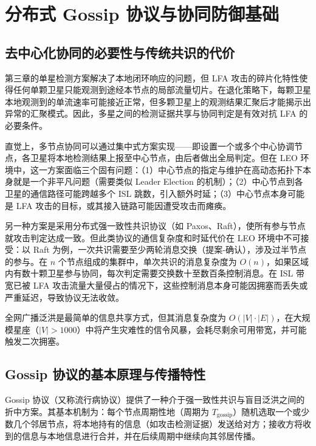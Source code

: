 \section{分布式 Gossip 协议与协同防御基础}

\subsection{去中心化协同的必要性与传统共识的代价}

第三章的单星检测方案解决了本地闭环响应的问题，但 LFA 攻击的碎片化特性使得任何单颗卫星只能观测到途经本节点的局部流量切片。在退化策略下，每颗卫星本地观测到的单流速率可能接近正常，但多颗卫星上的观测结果汇聚后才能揭示出异常的汇聚模式。因此，多星之间的检测证据共享与协同判定是有效对抗 LFA 的必要条件。

直觉上，多节点协同可以通过集中式方案实现——即设置一个或多个中心协调节点，各卫星将本地检测结果上报至中心节点，由后者做出全局判定。但在 LEO 环境中，这一方案面临三个固有问题：（1）中心节点的指定与维护在高动态拓扑下本身就是一个非平凡问题（需要类似 Leader Election 的机制）；（2）中心节点到各卫星的通信路径可能跨越多个 ISL 跳数，引入额外时延；（3）中心节点本身可能是 LFA 攻击的目标，或其接入链路可能因遭受攻击而瘫痪。

另一种方案是采用分布式强一致性共识协议（如 Paxos、Raft），使所有参与节点就攻击判定达成一致。但此类协议的通信复杂度和时延代价在 LEO 环境中不可接受：以 Raft 为例，一次共识需要至少两轮消息交换（提案-确认），涉及过半节点的参与。在 $n$ 个节点组成的集群中，单次共识的消息复杂度为 $O(n)$，如果区域内有数十颗卫星参与协同，每次判定需要交换数十至数百条控制消息。在 ISL 带宽已被 LFA 攻击流量大量侵占的情况下，这些控制消息本身可能因拥塞而丢失或严重延迟，导致协议无法收敛。

全网广播泛洪是最简单的信息共享方式，但其消息复杂度为 $O(|V| \cdot |E|)$，在大规模星座（$|V| > 1000$）中将产生灾难性的信令风暴，会耗尽剩余可用带宽，并可能触发二次拥塞。

\subsection{Gossip 协议的基本原理与传播特性}

Gossip 协议（又称流行病协议）提供了一种介于强一致性共识与盲目泛洪之间的折中方案。其基本机制为：每个节点周期性地（周期为 $T_{\text{gossip}}$）随机选取一个或少数几个邻居节点，将本地持有的信息（如攻击检测证据）发送给对方；接收方将收到的信息与本地信息进行合并，并在后续周期中继续向其邻居传播。

